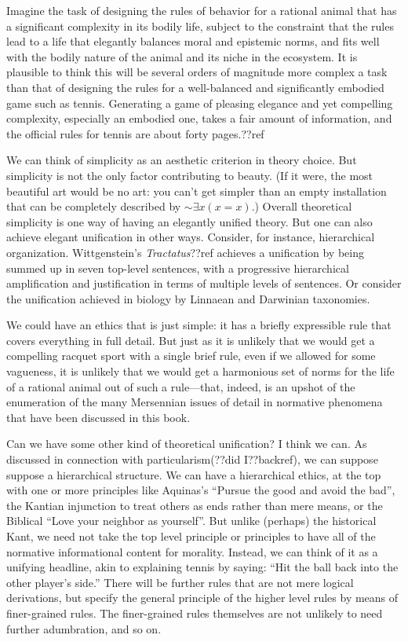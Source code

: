 Imagine the task of designing the rules of behavior for a rational animal that has a significant complexity in its bodily
life, subject to the constraint that the rules lead to a life that elegantly balances moral and epistemic norms, and fits
well with the bodily nature of the animal and its niche in the ecosystem. It is plausible to think this will be several
orders of magnitude more complex a task than that of designing the rules for a well-balanced and significantly embodied game 
such as tennis. Generating a game of pleasing elegance and yet compelling complexity, especially an embodied one, takes a 
fair amount of information, and the official rules for tennis are about forty pages.??ref 

We can think of simplicity as an aesthetic criterion in theory choice. But simplicity is not the only factor contributing
to beauty. (If it were, the most beautiful art would be no art: you can't get simpler than an empty installation that can be 
completely described by $\sim\exists x(x=x)$.) Overall theoretical simplicity is one way of having an elegantly unified
theory. But one can also achieve elegant unification in other ways. Consider, for instance, hierarchical organization. Wittgenstein's
\textit{Tractatus}??ref achieves a unification by being summed up in seven top-level sentences, with a progressive hierarchical
amplification and justification in terms of multiple levels of sentences. Or consider the unification achieved in biology by
Linnaean and Darwinian taxonomies.

We could have an ethics that is just simple: it has a briefly expressible rule that covers everything in full detail. But 
just as it is unlikely that we would get a compelling racquet sport with a single brief rule, even if we allowed for some
vagueness, it is unlikely that we would get a harmonious set of norms for the life of a rational animal out of such a rule---that, 
indeed, is an upshot of the enumeration of the many Mersennian issues of detail in normative phenomena that have been discussed
in this book. 

Can we have some other kind of theoretical unification? I think we can. As discussed in connection with particularism(??did I??backref),
we can suppose suppose a hierarchical structure. We can have a hierarchical ethics, at the top with one or more principles like Aquinas's ``Pursue the good
and avoid the bad'', the Kantian injunction to treat others as ends rather than mere means, or the Biblical ``Love your neighbor as yourself''.
But unlike (perhaps) the historical Kant, we need not take the top level principle or principles to have all of the normative informational 
content for morality. Instead, we can think of it as a unifying headline, akin to explaining tennis by saying: ``Hit the ball back into the
other player's side.'' There will be further rules that are not mere logical derivations, but specify the general principle of 
the higher level rules by means of finer-grained rules. The finer-grained rules themselves are not unlikely to need further adumbration, and so on.

